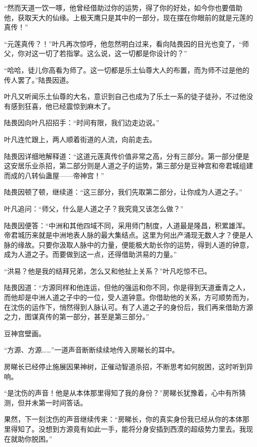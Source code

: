 \begin{this_body}
“然而天道一饮一啄，他曾经借助过你的运势，得了你的好处，如今你也要借助他，获取天大的仙缘。上极天鹰只是其中的一部分，现在摆在你眼前的就是元莲的真传！”

“元莲真传？！”叶凡再次惊呼，他忽然明白过来，看向陆畏因的目光也变了，“师父，你对这一切了若指掌。这么说，这一切都是你设计的？”

“哈哈，徒儿你高看为师了。这一切都是乐土仙尊大人的布置，而为师不过是他的传人罢了。”陆畏因道。

叶凡又听闻乐土仙尊的大名，意识到自己也成为了乐土一系的徒子徒孙，不过他没有感到狂喜，他已经震惊到麻木了。

陆畏因向叶凡招招手：“时间有限，我们边走边说。”

叶凡连忙跟上，两人顺着街道的人流，向前走去。

陆畏因详细地解释道：“这道元莲真传价值非常之高，分有三部分。第一部分便是这安居乐业杀招，第二部分则是人道之子的运势，第三部分是豆神宫和帝君城组建而成的八转仙蛊屋——帝神宫！”

陆畏因顿了顿，继续道：“这三部分，我们先取第二部分，让你成为人道之子。”

叶凡追问：“师父，什么是人道之子？我究竟又该怎么做？”

陆畏因便答：“中洲和其他四域不同，采用师门制度，人道最是隆昌，积累雄浑。帝君城历来就是中洲地表人脉的最大集结点。这里为何出产涌现无数人才？便是人脉的缘故。只要你汲取人脉中的力量，便能极大助长你的运势，得到人道的钟意，成为人道之子。而要做到这一点，还得借助洪易的力量。”

“洪易？他是我的结拜兄弟，怎么又和他扯上关系？”叶凡吃惊不已。

陆畏因道：“方源同样和他连运，但他的强运和你不同，你是得到天道垂青之人，而他却是中洲人道之子中的一位，受人道钟意。你借助他的关系，方可顺势而为，在沈伤的运作下，悄然得到人脉认可。有了人道之子的身份后，我们再来借助方源之力，图谋真传的第一部分，甚至是第三部分。”

豆神宫壁画。

“方源、方源……”一道声音断断续续地传入房睇长的耳中。

房睇长已经停止施展因果神树，正催动智道杀招，不断思考如何脱困，这时听到异响。

“是沈伤的声音！他是从本体那里得知了我的身份？”房睇长犹豫着，心中有所猜测，但并未第一时间答话。

果然，下一刻沈伤的声音继续传来：“房睇长，你的真实身份我已经从你的本体那里得知了。没想到方源竟有如此一手，能将分身安插到西漠的超级势力里去。我现在就助你脱困。”


\end{this_body}
